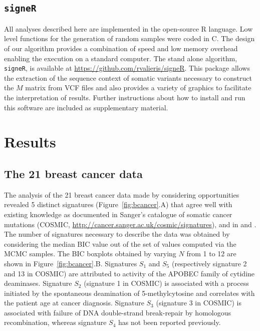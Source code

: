 \documentclass{bioinfo}
\newcommand{\CC}{C\nolinebreak\hspace{-.05em}\raisebox{.4ex}{\tiny
    +}\nolinebreak\hspace{-.15em}\raisebox{.4ex}{\tiny +}}
\begin{document}
\subsection{\texttt{signeR}}
All analyses described here are implemented in the open-source R
language. Low level functions for the generation of random samples
were coded in \CC. The design of our algorithm provides a combination
of speed and low memory overhead enabling the execution on a standard
computer. The stand alone algorithm, \texttt{signeR}, is available at
\url{https://github.com/rvalieris/signeR}. This package allows the
extraction of the sequence context of somatic variants
necessary to construct the $M$ matrix from VCF files and also
provides a variety of graphics to facilitate the interpretation of
results. Further instructions about how to install and run this
software are included as supplementary material.

\section{Results}
\subsection{The 21 breast cancer data}
The analysis of the 21 breast cancer data made by considering
opportunities revealed 5 distinct signatures
(Figure~\ref{fig:bcancer}.A) that agree well with existing knowledge
as documented in Sanger's catalogue of somatic cancer mutations
(COSMIC, \url{http://cancer.sanger.ac.uk/cosmic/signatures}), and
in \cite{HEN} and \cite{ANat}. The number of signatures necessary to
describe the data was obtained by considering the median BIC value out
of the set of values computed via the MCMC samples. The BIC boxplots
obtained by varying $N$ from 1 to 12 are shown in
Figure~\ref{fig:bcancer}.B. Signatures $S_1$ and $S_5$ (respectively
signature 2 and 13 in COSMIC) are attributed to activity of the APOBEC
family of cytidine deaminases.  Signature $S_2$ (signature 1 in
COSMIC) is associated with a process initiated by the spontaneous
deamination of 5-methylcytosine and correlates with the patient age at
cancer diagnosis. Signature $S_3$ (signature 3 in COSMIC) is
associated with failure of DNA double-strand break-repair by
homologous recombination, whereas signature $S_4$ has not been
reported previously.
\end{document}

